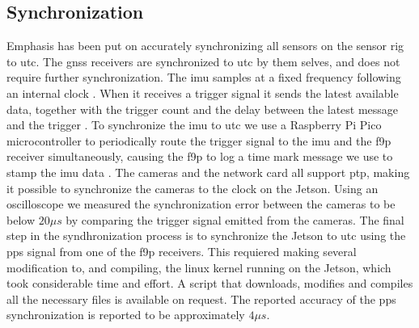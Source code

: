 \subsection{Synchronization}
Emphasis has been put on accurately synchronizing all sensors on the sensor rig to \gls{utc}.
The \gls{gnss} receivers are synchronized to \gls{utc} by them selves, and does not require further synchronization.
The \gls{imu} samples at a fixed frequency following an internal clock \cite{safranSTIM300Datasheet}.
When it receives a trigger signal it sends the latest available data, together with the trigger count and the delay between the latest message and the trigger \cite{safranSTIM300Datasheet}.
To synchronize the \gls{imu} to \gls{utc} we use a Raspberry Pi Pico microcontroller to periodically route the trigger signal to the \gls{imu} and the \gls{f9p} receiver simultaneously, causing the \gls{f9p} to log a time mark message we use to stamp the \gls{imu} data \cite[190]{u-bloxZEDF9PInterfaceDescription}.
The cameras and the network card all support \gls{ptp}, making it possible to synchronize the cameras to the clock on the Jetson.
Using an oscilloscope we measured the synchronization error between the cameras to be below $20\mu s$ by comparing the trigger signal emitted from the cameras.
The final step in the syndhronization process is to synchronize the Jetson to \gls{utc} using the \gls{pps} signal from one of the \gls{f9p} receivers.
This requiered making several modification to, and compiling, the linux kernel running on the Jetson, which took considerable time and effort.
A script that downloads, modifies and compiles all the necessary files is available on request.
The reported accuracy of the \gls{pps} synchronization is reported to be approximately $4\mu s$.








